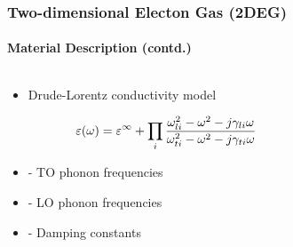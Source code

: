 \documentclass[mathserif,18pt,xcolor=table]{beamer}
\begin{document}
  \begin{frame}
    \frametitle{Two-dimensional Electon Gas (2DEG)}
    \framesubtitle{Material Description (contd.)}
    \begin{columns}[T] %
      \begin{column}{.5\textwidth}
        \begin{itemize}
          \item Drude-Lorentz conductivity model
        \end{itemize}
        \begin{equation} \nonumber
          \varepsilon(\omega) = \varepsilon^{\infty} + \prod_i\frac{\omega_{li}^2 - \omega^2 - j\gamma_{li} \omega}{\omega_{ti}^2 - \omega^2 - j\gamma_{ti} \omega}
          \label{eq:eps}
        \end{equation}
        \begin{itemize}
          \item[]{ - TO phonon frequencies}
          \item[]{ - LO phonon frequencies}
          \item[]{\makebox[.3cm][l]{$\gamma$} - Damping constants}
        \end{itemize}
      \end{column}
      \begin{column}[T]{.5\textwidth}
        \end{column}%
      \end{columns}
    \end{frame}
\end{document}
